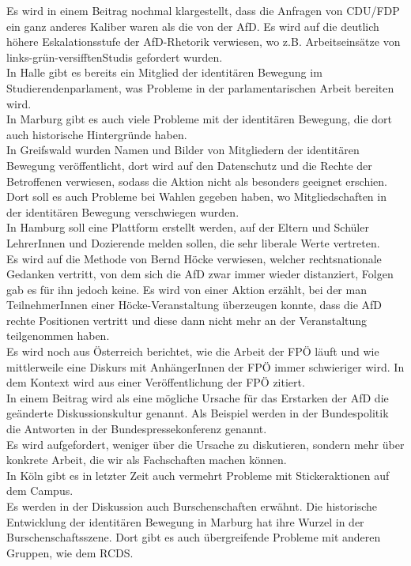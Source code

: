 Es wird in einem Beitrag nochmal klargestellt, dass die Anfragen von CDU/FDP ein ganz anderes Kaliber waren als die von der AfD. Es wird auf die deutlich höhere Eskalationsstufe der AfD-Rhetorik verwiesen, wo z.B. Arbeitseinsätze von \flqq links-grün-versifften\frqq Studis gefordert wurden. \\
In Halle gibt es bereits ein Mitglied der identitären Bewegung im Studierendenparlament, was Probleme in der parlamentarischen Arbeit bereiten wird. \\
In Marburg gibt es auch viele Probleme mit der identitären Bewegung, die dort auch historische Hintergründe haben. \\
In Greifswald wurden Namen und Bilder von Mitgliedern der identitären Bewegung veröffentlicht, dort wird auf den Datenschutz und die Rechte der Betroffenen verwiesen, sodass die Aktion nicht als besonders geeignet erschien. Dort soll es auch Probleme bei Wahlen gegeben haben, wo Mitgliedschaften in der identitären Bewegung verschwiegen wurden. \\
In Hamburg soll eine Plattform erstellt werden, auf der Eltern und Schüler LehrerInnen und Dozierende melden sollen, die sehr liberale Werte vertreten.  \\
Es wird auf die Methode von Bernd Höcke verwiesen, welcher rechtsnationale Gedanken vertritt, von dem sich die AfD zwar immer wieder distanziert, Folgen gab es für ihn jedoch keine. Es wird von einer Aktion erzählt, bei der man TeilnehmerInnen einer Höcke-Veranstaltung überzeugen konnte, dass die AfD rechte Positionen vertritt und diese dann nicht mehr an der Veranstaltung teilgenommen haben. \\
Es wird noch aus Österreich berichtet, wie die Arbeit der FPÖ läuft und wie mittlerweile eine Diskurs mit AnhängerInnen der FPÖ immer schwieriger wird. In dem Kontext wird aus einer Veröffentlichung der FPÖ zitiert. \\
In einem Beitrag wird als eine mögliche Ursache für das Erstarken der AfD die geänderte Diskussionskultur genannt. Als Beispiel werden in der Bundespolitik die Antworten in der Bundespressekonferenz genannt. \\
Es wird aufgefordert, weniger über die Ursache zu diskutieren, sondern mehr über konkrete Arbeit, die wir als Fachschaften machen können. \\
In Köln gibt es in letzter Zeit auch vermehrt Probleme mit Stickeraktionen auf dem Campus. \\
Es werden in der Diskussion auch Burschenschaften erwähnt. Die historische Entwicklung der identitären Bewegung in Marburg hat ihre Wurzel in der Burschenschaftsszene. Dort gibt es auch übergreifende Probleme mit anderen Gruppen, wie dem RCDS. \\
